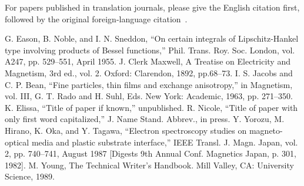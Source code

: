 \documentclass[conference, letter]{IEEEtran}
\begin{document}
For papers published in translation journals, please give the English citation first, followed by the original foreign-language citation~\cite{b6}. 

\begin{thebibliography}{00}
 G. Eason, B. Noble, and I. N. Sneddon, ``On certain integrals of Lipschitz-Hankel type involving products of Bessel functions,'' Phil. Trans. Roy. Soc. London, vol. A247, pp. 529--551, April 1955.
 J. Clerk Maxwell, A Treatise on Electricity and Magnetism, 3rd ed., vol. 2. Oxford: Clarendon, 1892, pp.68--73.
 I. S. Jacobs and C. P. Bean, ``Fine particles, thin films and exchange anisotropy,'' in Magnetism, vol. III, G. T. Rado and H. Suhl, Eds. New York: Academic, 1963, pp. 271--350.
 K. Elissa, ``Title of paper if known,'' unpublished.
 R. Nicole, ``Title of paper with only first word capitalized,'' J. Name Stand. Abbrev., in press.
 Y. Yorozu, M. Hirano, K. Oka, and Y. Tagawa, ``Electron spectroscopy studies on magneto-optical media and plastic substrate interface,'' IEEE Transl. J. Magn. Japan, vol. 2, pp. 740--741, August 1987 [Digests 9th Annual Conf. Magnetics Japan, p. 301, 1982].
 M. Young, The Technical Writer's Handbook. Mill Valley, CA: University Science, 1989.
\end{thebibliography}
\vspace{12pt}


\end{document}
